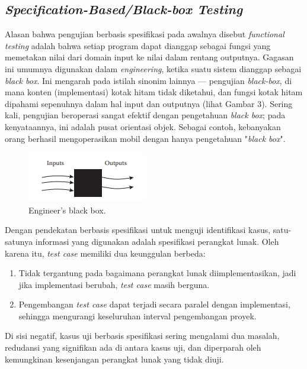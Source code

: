 \documentclass[a4paper,twoside]{article}
\begin{document}
\begin{enumerate}
\subsection*{\textit{Specification-Based/Black-box Testing}}
Alasan bahwa pengujian berbasis spesifikasi pada awalnya disebut \textit{functional testing} adalah bahwa setiap program dapat dianggap sebagai fungsi yang memetakan nilai dari domain input ke nilai dalam rentang outputnya. Gagasan ini umumnya digunakan dalam \textit{engineering}, ketika suatu sistem dianggap sebagai \textit{black box}. Ini mengarah pada istilah sinonim lainnya — pengujian \textit{black-box}, di mana konten (implementasi) kotak hitam tidak diketahui, dan fungsi kotak hitam dipahami sepenuhnya dalam hal input dan outputnya (lihat Gambar 3). Sering kali, pengujian beroperasi sangat efektif dengan pengetahuan \textit{black box}; pada kenyataannya, ini adalah pusat orientasi objek. Sebagai contoh, kebanyakan orang berhasil mengoperasikan mobil dengan hanya pengetahuan "\textit{black box}".
\begin{figure}[h!]
	\includegraphics[scale=1.0]{../DokumenSkripsi/gambar/blackbox}
	\centering
	\caption{Engineer’s black box.}
\end{figure}

Dengan pendekatan berbasis spesifikasi untuk menguji identifikasi kasus, satu-satunya informasi yang digunakan adalah spesifikasi perangkat lunak. Oleh karena itu, \textit{test case} memiliki dua keunggulan berbeda: 
\begin{enumerate}
\item Tidak tergantung pada bagaimana perangkat lunak diimplementasikan, jadi jika implementasi berubah, \textit{test case} masih berguna.
\item Pengembangan \textit{test case} dapat terjadi secara paralel dengan implementasi, sehingga mengurangi keseluruhan interval pengembangan proyek.
\end{enumerate} 
Di sisi negatif, kasus uji berbasis spesifikasi sering mengalami dua masalah, redudansi yang signifikan ada di antara kasus uji, dan diperparah oleh kemungkinan kesenjangan perangkat lunak yang tidak diuji.


\end{enumerate}
\end{document}
